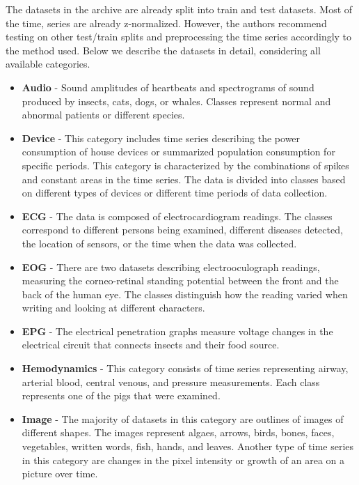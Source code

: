 \documentclass[a4paper,11pt,twoside]{report}
\theoremstyle{definition}
\begin{document}
The datasets in the archive are already split into train and test datasets. Most of the time, series are already z-normalized. However, the authors recommend testing on other test/train splits and preprocessing the time series accordingly to the method used. Below we describe the datasets in detail, considering all available categories.

\begin{itemize}
\item \textbf{Audio} - Sound amplitudes of heartbeats and spectrograms of sound produced by insects, cats, dogs, or whales. Classes represent normal and abnormal patients or different species.

\item \textbf{Device} - This category includes time series describing the power consumption of house devices or summarized population consumption for specific periods. This category is characterized by the combinations of spikes and constant areas in the time series. The data is divided into classes based on different types of devices or different time periods of data collection.

\item \textbf{ECG} - The data is composed of electrocardiogram readings. The classes correspond to different persons being examined, different diseases detected, the location of sensors, or the time when the data was collected.

\item \textbf{EOG} - There are two datasets describing electrooculograph readings, measuring the corneo-retinal standing potential between the front and the back of the human eye. The classes distinguish how the reading varied when writing and looking at different characters.
\item \textbf{EPG} - The electrical penetration graphs measure voltage changes in the electrical circuit that connects insects and their food source.
\item \textbf{Hemodynamics} - This category consists of time series representing airway, arterial blood, central venous, and pressure measurements. Each class represents one of the pigs that were examined.

\item \textbf{Image} - The majority of datasets in this category are outlines of images of different shapes. The images represent algaes, arrows, birds, bones, faces, vegetables, written words, fish, hands, and leaves. Another type of time series in this category are changes in the pixel intensity or growth of an area on a picture over time.


\end{itemize}
\end{document}
